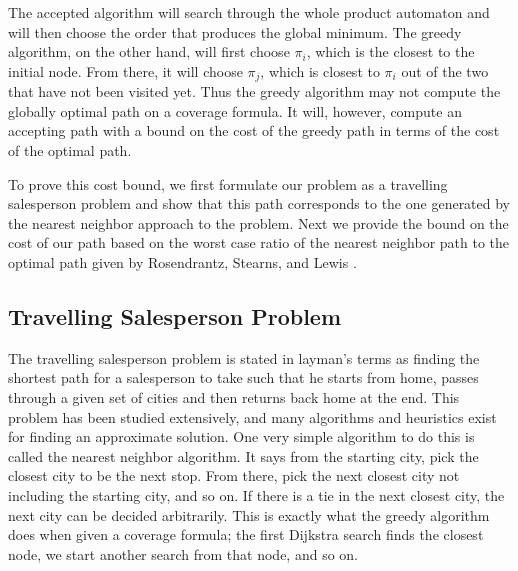 The accepted algorithm will search through the whole product automaton and will then choose the order that produces the global minimum. The greedy algorithm, on the other hand, will first choose $\pi_i$, which is the closest to the initial node. From there, it will choose $\pi_j$, which is closest to $\pi_i$ out of the two that have not been visited yet. Thus the greedy algorithm may not compute the globally optimal path on a coverage formula. It will, however, compute an accepting path with a bound on the cost of the greedy path in terms of the cost of the optimal path. 

To prove this cost bound, we first formulate our problem as a travelling salesperson problem and show that this path corresponds to the one generated by the nearest neighbor approach to the problem. Next we provide the bound on the cost of our path based on the worst case ratio of the nearest neighbor path to the optimal path given by Rosendrantz, Stearns, and Lewis \cite{rosenkrantz74}. 


\subsection{Travelling Salesperson Problem}
The travelling salesperson problem is stated in layman's terms as finding the shortest path for a salesperson to take such that he starts from home, passes through a given set of cities and then returns back home at the end. This problem has been studied extensively, and many algorithms and heuristics exist for finding an approximate solution. One very simple algorithm to do this is called the nearest neighbor algorithm. It says from the starting city, pick the closest city to be the next stop. From there, pick the next closest city not including the starting city, and so on. If there is a tie in the next closest city, the next city can be decided arbitrarily. This is exactly what the greedy algorithm does when given a coverage formula; the first Dijkstra search finds the closest node, we start another search from that node, and so on. 


